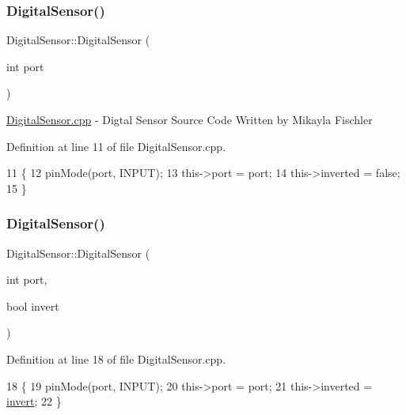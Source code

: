 \subsubsection{\texorpdfstring{Digital\+Sensor()}{DigitalSensor()}\hspace{0.1cm}{\footnotesize\ttfamily [1/2]}}
{\footnotesize\ttfamily Digital\+Sensor\+::\+Digital\+Sensor (\begin{DoxyParamCaption}\item[{int}]{port }\end{DoxyParamCaption})}

\hyperlink{_digital_sensor_8cpp}{Digital\+Sensor.\+cpp} -\/ Digtal Sensor Source Code Written by Mikayla Fischler 

Definition at line 11 of file Digital\+Sensor.\+cpp.


\begin{DoxyCode}
11                                      \{
12     pinMode(port, INPUT);
13     this->port = port;
14     this->inverted = \textcolor{keyword}{false};
15 \}
\end{DoxyCode}
\mbox{\label{class_digital_sensor_aaccd3ee6cb96375888f4d6ebe5ef47b4}} 
\subsubsection{\texorpdfstring{Digital\+Sensor()}{DigitalSensor()}\hspace{0.1cm}{\footnotesize\ttfamily [2/2]}}
{\footnotesize\ttfamily Digital\+Sensor\+::\+Digital\+Sensor (\begin{DoxyParamCaption}\item[{int}]{port,  }\item[{bool}]{invert }\end{DoxyParamCaption})}



Definition at line 18 of file Digital\+Sensor.\+cpp.


\begin{DoxyCode}
18                                                   \{
19     pinMode(port, INPUT);
20     this->port = port;
21     this->inverted = \hyperlink{class_digital_sensor_a1e6784022a127dd543bbfcc4f69c4802}{invert};
22 \}
\end{DoxyCode}
\mbox{\label{class_digital_sensor_ab74d9e7e77b4ea505cd42a364017ded0}} 
